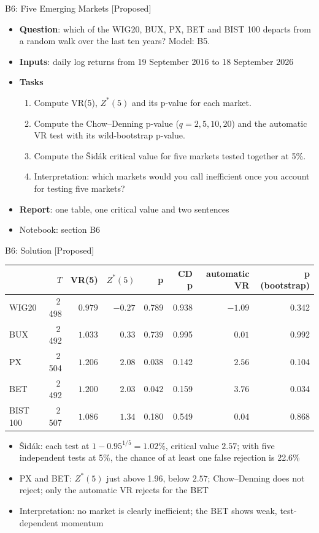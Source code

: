 \begin{frame}{B6: Five Emerging Markets [Proposed]}
\itemsize{\footnotesize}
\begin{itemize}
\item \textbf{Question}: which of the WIG20, BUX, PX, BET and BIST 100 departs from a random walk over the last ten years? Model: B5.
\item \textbf{Inputs}: daily log returns from 19 September 2016 to 18 September 2026
\item \textbf{Tasks}
\begin{enumerate}
    \item Compute VR(5), $Z^*(5)$ and its p-value for each market.
    \item Compute the Chow--Denning p-value ($q = 2, 5, 10, 20$) and the automatic VR test with its wild-bootstrap p-value.
    \item Compute the Šidák critical value for five markets tested together at 5\%.
    \item Interpretation: which markets would you call inefficient once you account for testing five markets?
\end{enumerate}
\item \textbf{Report}: one table, one critical value and two sentences
\item Notebook: section B6
\end{itemize}
\end{frame}

\ifsolutions
\begin{frame}{B6: Solution [Proposed]}
\itemsize{\footnotesize}
\begin{center}
\footnotesize
\begin{tabular}{lrrrrrrr}
\toprule
& $T$ & VR(5) & $Z^*(5)$ & p & CD p & automatic VR & p (bootstrap) \\
\midrule
WIG20 & 2\,498 & $0.979$ & ${-0.27}$ & 0.789 & 0.938 & ${-1.09}$ & 0.342 \\
BUX & 2\,492 & $1.033$ & ${0.33}$ & 0.739 & 0.995 & ${0.01}$ & 0.992 \\
PX & 2\,504 & $1.206$ & ${2.08}$ & 0.038 & 0.142 & ${2.56}$ & 0.104 \\
BET & 2\,492 & $1.200$ & ${2.03}$ & 0.042 & 0.159 & ${3.76}$ & 0.034 \\
BIST 100 & 2\,507 & $1.086$ & ${1.34}$ & 0.180 & 0.549 & ${0.04}$ & 0.868 \\
\bottomrule
\end{tabular}
\end{center}
\begin{itemize}
    \item Šidák: each test at $1 - 0.95^{1/5} = 1.02\%$, critical value $2.57$; with five independent tests at 5\%, the chance of at least one false rejection is 22.6\%
    \item PX and BET: $Z^*(5)$ just above 1.96, below $2.57$; Chow--Denning does not reject; only the automatic VR rejects for the BET
    \item Interpretation: no market is clearly inefficient; the BET shows weak, test-dependent momentum
\end{itemize}
\end{frame}
\fi


